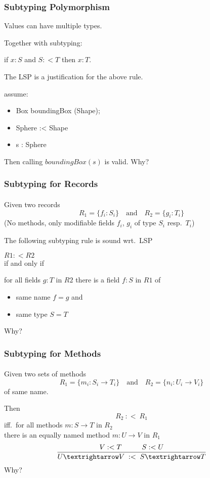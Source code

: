 \documentclass{beamer}
\begin{document}
\begin{frame}
\frametitle{Subtyping Polymorphism}

\begin{definition}[Polymorphism]
   Values can have multiple types.
\end{definition}

Together with subtyping:
\begin{center}
  if $x : S$ and $S :< T$ then $x : T$.
\end{center}
The LSP is a justification for the above rule.

\begin{example}
  assume: 
  \begin{itemize}
  \item Box boundingBox (Shape);
  \item Sphere :< Shape
  \item s : Sphere
  \end{itemize}
  Then calling $boundingBox(s)$ is valid. Why?  
\end{example}

\end{frame}

\begin{frame}
\frametitle{Subtyping for Records}
\framesubtitle{}

Given two records 
\[ 
   R_1 = \{f_i : S_i\} \quad \text{and} \quad R_2 = \{g_i : T_i\}
\]
(No methods, only modifiable fields $f_i$, $g_i$ of type $S_i$ resp.\ $T_i$)

\pause

The following subtyping rule is sound wrt.\ LSP

\begin{center}
  $R1 :< R2$\\[0.5em]
  if and only if \\[0.5em]
  \begin{minipage}{0.75\textwidth}
    for all fields $g:T$ in $R2$ there is a field $f:S$ in $R1$ of
    \begin{itemize}
    \item same name $f=g$ and
    \item same type $S=T$
    \end{itemize}
  \end{minipage}
\end{center}
   
Why?

\end{frame}


\begin{frame}
\frametitle{Subtyping for Methods}
\framesubtitle{}

Given two sets of methods \[
   R_1=\{m_i : S_i \rightarrow T_i\} \quad \text{and}\quad R_2=\{n_i :U_i \rightarrow V_i\}
\]
of same name.\medskip\pause

Then 
\[R_2~:<~R_1\]
iff.\ for all methods $m:S\rightarrow T$ in $R_2$\\ 
there is an equally named method $m: U\rightarrow V$ in $R_1$\hfill 
\[
\frac{\; V :< T \mbox{\hspace{1cm}}  S :< U \;}{U → V \; :< \; S → T}
\]
Why?

\end{frame}
\end{document}
